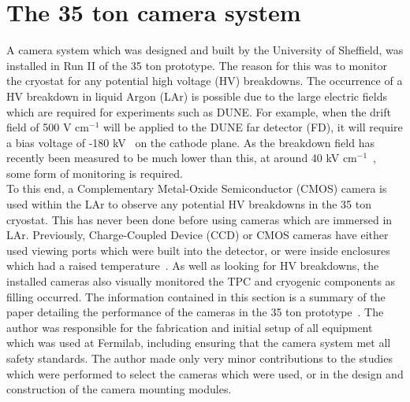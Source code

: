
\chapter{The 35 ton camera system} \label{chap:Cameras} %



\graphicspath{{The35tonCameras/Figs/Raster/}{The35tonCameras/Figs/PDF/}{The35tonCameras/Figs/Vector/}}

A camera system which was designed and built by the University of Sheffield, was installed in Run II of the 35 ton prototype. The reason for this was to monitor the cryostat for any potential high voltage (HV) breakdowns. The occurrence of a HV breakdown in liquid Argon (LAr) is possible due to the large electric fields which are required for experiments such as DUNE. For example, when the drift field of 500 V cm$^{-1}$ will be applied to the DUNE far detector (FD), it will require a bias voltage of -180 kV~\citep{DUNECDR_V4} on the cathode plane. As the breakdown field has recently been measured to be much lower than this, at around 40 kV cm$^{-1}$~\citep{BlatterEField}, some form of monitoring is required. \\

To this end, a Complementary Metal-Oxide Semiconductor (CMOS) camera is used within the LAr to observe any potential HV breakdowns in the 35 ton cryostat. This has never been done before using cameras which are immersed in LAr. Previously, Charge-Coupled Device (CCD) or CMOS cameras have either used viewing ports which were built into the detector, or were inside enclosures which had a raised temperature~\citep{BlatterEField,BERNcam,LAPD,Liverpool,Weizmannbubbles}. As well as looking for HV breakdowns, the installed cameras also visually monitored the TPC and cryogenic components as filling occurred. The information contained in this section is a summary of the paper detailing the performance of the cameras in the 35 ton prototype~\citep{CameraPaper}. The author was responsible for the fabrication and initial setup of all equipment which was used at Fermilab, including ensuring that the camera system met all safety standards. The author made only very minor contributions to the studies which were performed to select the cameras which were used, or in the design and construction of the camera mounting modules. \\

